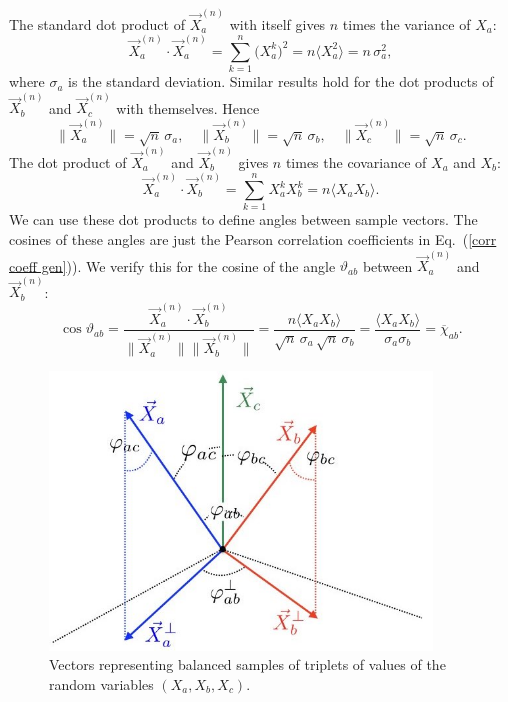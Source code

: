The standard dot product of $\vec{X}^{(n)}_a$ with itself gives $n$ times the variance of $X_a$:
\begin{equation}
\vec{X}^{(n)}_a \! \cdot \! \vec{X}^{(n)}_a = \sum_{k=1}^n \big(X_a^k)^2 = n \langle X_a^2 \rangle = n \, \sigma_a^2,
\label{dot product aa}
\end{equation}
where $\sigma_a$ is the standard deviation. Similar results hold for the dot products of $\vec{X}^{(n)}_b$ and $\vec{X}^{(n)}_c$ with themselves. Hence 
\begin{equation}
\| \vec{X}^{(n)}_a \| = \sqrt{n} \, \sigma_a, \quad \| \vec{X}^{(n)}_b \| = \sqrt{n} \, \sigma_b, \quad \| \vec{X}^{(n)}_c \| = \sqrt{n} \, \sigma_c.
\label{dot products aa bb cc}
\end{equation}
The dot product of $\vec{X}^{(n)}_a$ and $\vec{X}^{(n)}_b$ gives $n$ times the covariance of $X_a$ and $X_b$:
\begin{equation}
\vec{X}^{(n)}_a \! \cdot \! \vec{X}^{(n)}_b = \sum_{k=1}^n  X_a^k  X_b^k = n \langle X_a X_b \rangle.
\label{dot product ab}
\end{equation}
We can use these dot products to define angles between sample vectors. The cosines of these angles are just the Pearson correlation coefficients in Eq.\ (\ref{corr coeff gen})). We verify this for the cosine of the angle $\vartheta_{ab}$ between $\vec{X}^{(n)}_a$ and $\vec{X}^{(n)}_b$:
\begin{equation}
\cos{\vartheta_{ab}} = \frac{\vec{X}^{(n)}_a \! \cdot \! \vec{X}^{(n)}_b}{\| \vec{X}^{(n)}_a \| \| \vec{X}^{(n)}_b \|} = \frac{n  \langle X_a X_b \rangle}{\sqrt{n} \, \sigma_a \, \sqrt{n} \, \sigma_b} =
 \frac{\langle X_a X_b \rangle}{ \sigma_a \sigma_b} = \overline{\chi}_{ab}.
\label{sample vectors a b angle}
\end{equation}

\begin{figure}[h!]
 \centering
   \includegraphics[width=4in]{vectors4yule.jpeg} 
   \caption{Vectors representing balanced samples of triplets of values of the random variables $(X_a, X_b, X_c)$.}
   \label{vectors4yule}
\end{figure}

